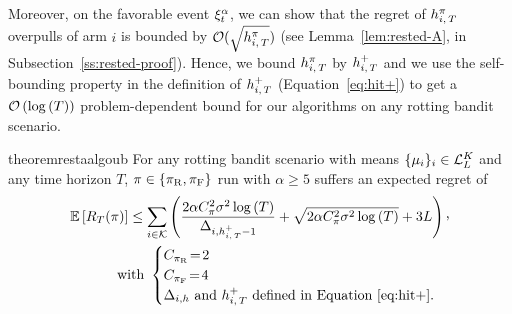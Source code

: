 Moreover,  on the favorable event $\xi^\alpha_t$, we can show that the regret of $h_{i,\,T}^\pi$ overpulls of arm $i$ is bounded by $\mathcal{O} (\sqrt{h_{i,\,T}^\pi})$ (see Lemma~\ref{lem:rested-A}, in Subsection~\ref{ss:rested-proof}). Hence, we bound $h_{i,\,T}^\pi$ by $h_{i,\,T}^+$ and we use the self-bounding property in the definition of $h_{i,\,T}^+$ (Equation~\ref{eq:hit+}) to get a $\mathcal{O}\left(\log\left(T\right)\right)$ problem-dependent bound for our algorithms on any rotting bandit scenario. 

\begin{restatable}{theorem}{restaalgoub}\label{th:rested-PD}
For any rotting bandit scenario with means $\{\mu_i\}_{i} \in \mathcal{L}_L^K$ and any time horizon $T$, $\pi \in \left\{\pi_{\rm R}, \pi_{\rm F} \right\}$ run with $\alpha \geq 5$ suffers an expected regret of
\begin{align*}
\mathbb{E}\left[R_T(\pi)\right]  \leq \sum_{i\in \arms} \pa{\frac{2\alpha C_\pi^2\sigma^2\log\pa{T}}{\Delta_{i,\hiT^+-1}} + \sqrt{2\alpha C_\pi^2\sigma^2\log\pa{T}} +3L } \CommaBin \\
\text{with } 
\begin{cases}
C_{\piR} \!=\! 2\\
C_{\piF} \!=\! 4\\
\text{$\Delta_{i,h}$ and $\hiT^+$ defined in Equation~\ref{eq:hit+}.}
\end{cases}
\end{align*}
\end{restatable}
